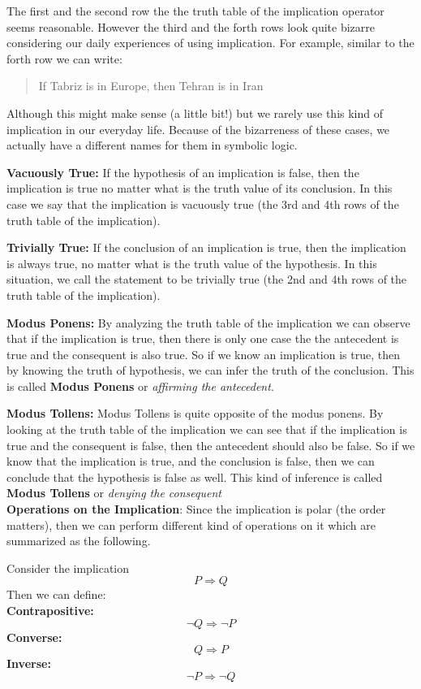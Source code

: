 The first and the second row the the truth table of the implication operator seems reasonable. However the third and the forth rows look quite bizarre considering our daily experiences of using implication. For example, similar to the forth row we can write:
\begin{quote}
	If Tabriz is in Europe, then Tehran is in Iran
\end{quote}
Although this might make sense (a little bit!) but we rarely use this kind of implication in our everyday life. Because of the bizarreness of these cases, we actually have a different names for them in symbolic logic.

\textbf{Vacuously True:} If the hypothesis of an implication is false, then the implication is true no matter what is the truth value of its conclusion. In this case we say that the implication is vacuously true (the 3rd and 4th rows of the truth table of the implication). 

\textbf{Trivially True:} If the conclusion of an implication is true, then the implication is always true, no matter what is the truth value of the hypothesis. In this situation, we call the statement to be trivially true (the 2nd and 4th rows of the truth table of the implication).


\textbf{Modus Ponens:} By analyzing the truth table of the implication we can observe that if the implication is true, then there is only one case the the antecedent is true and the consequent is also true. So if we know an implication is true, then by knowing the truth of hypothesis, we can infer the truth of the conclusion. This is called \textbf{Modus Ponens} or \emph{affirming the antecedent}.

\textbf{Modus Tollens:} Modus Tollens is quite opposite of the modus ponens. By looking at the truth table of the implication we can see that if the implication is true and the consequent is false, then the antecedent should also be false. So if we know that the implication is true, and the conclusion is false, then we can conclude that the hypothesis is false as well. This kind of inference is called \textbf{Modus Tollens} or \emph{denying the consequent} \\

\textbf{Operations on the Implication}: Since the implication is polar (the order matters), then we can perform different kind of operations on it which are summarized as the following.

\begin{defbox}{}
	Consider the implication
	\[  P \Rightarrow Q  \]
	Then we can define:\\
	
	\textbf{Contrapositive:}
	\[  \neg Q \Rightarrow \neg P  \]
	\textbf{Converse:}
	\[  Q \Rightarrow P  \] 
	\textbf{Inverse:}
	\[ \neg P \Rightarrow \neg Q \]
\end{defbox}

